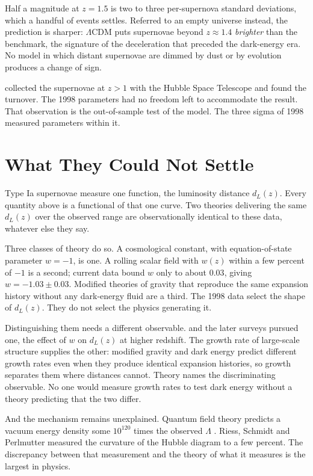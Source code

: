 \documentclass[11pt]{article}
\begin{document}
Half a magnitude at $z = 1.5$ is two to three per-supernova standard
deviations, which a handful of events settles.  Referred to an empty universe
instead, the prediction is sharper: $\Lambda$CDM puts supernovae beyond $z
\approx 1.4$ \emph{brighter} than the benchmark, the signature of the
deceleration that preceded the dark-energy era.  No model in which distant
supernovae are dimmed by dust or by evolution produces a change of sign.

\citet{Riess2004} collected the supernovae at $z > 1$ with the Hubble Space
Telescope and found the turnover.  The 1998 parameters had no freedom left to
accommodate the result.  That observation is the out-of-sample test of the
model.  The three sigma of 1998 measured parameters within it.

\section{What They Could Not Settle}
\label{sec:limits}

Type Ia supernovae measure one function, the luminosity distance $d_L(z)$.
Every quantity above is a functional of that one curve.  Two theories
delivering the same $d_L(z)$ over the observed range are observationally
identical to these data, whatever else they say.

Three classes of theory do so.  A cosmological constant, with equation-of-state
parameter $w = -1$, is one.  A rolling scalar field with $w(z)$ within a few
percent of $-1$ is a second; current data bound $w$ only to about $0.03$,
giving $w = -1.03 \pm 0.03$.  Modified theories of gravity that reproduce the
same expansion history without any dark-energy fluid are a third.  The 1998
data select the shape of $d_L(z)$.  They do not select the physics generating
it.

Distinguishing them needs a different observable.  \citet{Riess2004} and the
later surveys pursued one, the effect of $w$ on $d_L(z)$ at higher redshift.
The growth rate of large-scale structure supplies the other: modified gravity
and dark energy predict different growth rates even when they produce
identical expansion histories, so growth separates them where distances
cannot.  Theory names the discriminating observable.  No one would measure
growth rates to test dark energy without a theory predicting that the two
differ.

And the mechanism remains unexplained.  Quantum field theory predicts a vacuum
energy density some $10^{120}$ times the observed $\Lambda$
\citep{Weinberg1989}.  Riess, Schmidt and Perlmutter measured the curvature of
the Hubble diagram to a few percent.  The discrepancy between that measurement
and the theory of what it measures is the largest in physics.
\end{document}
